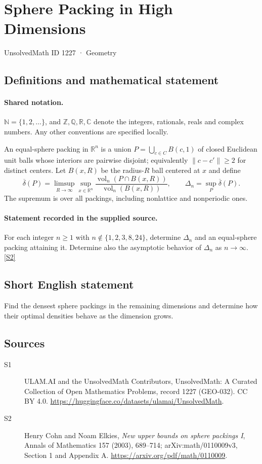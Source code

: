 \documentclass[11pt]{article}
\newcommand{\sref}[2]{\hyperlink{source:#1:#2}{[S#2]}}
\begin{document}
\setcounter{section}{1226}
\section{Sphere Packing in High Dimensions}\label{1227}
{\small\sffamily UnsolvedMath ID 1227 · Geometry}
\subsection{Definitions and mathematical statement}

\paragraph{Shared notation.}$\mathbb N=\{1,2,\ldots\}$, and $\mathbb Z,\mathbb Q,\mathbb R,\mathbb C$ denote the integers, rationals, reals and complex numbers. Any other conventions are specified locally.


An equal-sphere packing in $\mathbb R^n$ is a union $P=\bigcup_{c\in C}B(c,1)$ of closed Euclidean unit balls whose interiors are pairwise disjoint; equivalently $\lVert c-c'\rVert\geq2$ for distinct centers. Let $B(x,R)$ be the radius-$R$ ball centered at $x$ and define
\[
\overline\delta(P)=\limsup_{R\to\infty}\sup_{x\in\mathbb R^n}
\frac{\operatorname{vol}_n(P\cap B(x,R))}{\operatorname{vol}_n(B(x,R))},\qquad
\Delta_n=\sup_{P}\overline\delta(P).
\]
The supremum is over all packings, including nonlattice and nonperiodic ones.
\paragraph{Statement recorded in the supplied source.}
For each integer $n\geq1$ with $n\notin\{1,2,3,8,24\}$, determine $\Delta_n$ and an equal-sphere packing attaining it. Determine also the asymptotic behavior of $\Delta_n$ as $n\to\infty$. \sref{1227}{2}

\subsection{Short English statement}
Find the densest sphere packings in the remaining dimensions and determine how their optimal densities behave as the dimension grows.
\subsection{Sources}
\begin{description}
\item[\hypertarget{source:1227:1}{S1}] ULAM.AI and the UnsolvedMath Contributors, UnsolvedMath: A Curated Collection of Open Mathematics Problems, record 1227 (GEO-032). CC BY 4.0. \url{https://huggingface.co/datasets/ulamai/UnsolvedMath}.
\item[\hypertarget{source:1227:2}{S2}] Henry Cohn and Noam Elkies, \emph{New upper bounds on sphere packings I}, Annals of Mathematics 157 (2003), 689--714; arXiv:math/0110009v3, Section 1 and Appendix A. \url{https://arxiv.org/pdf/math/0110009}.
\end{description}
\label{end:1227}
\end{document}
